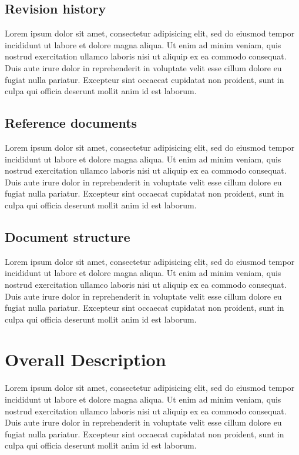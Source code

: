 \documentclass[10pt,a4paper]{report}
\begin{document}
	\section{Revision history}
	Lorem ipsum dolor sit amet, consectetur adipisicing elit, sed do eiusmod
	tempor incididunt ut labore et dolore magna aliqua. Ut enim ad minim veniam,
	quis nostrud exercitation ullamco laboris nisi ut aliquip ex ea commodo
	consequat. Duis aute irure dolor in reprehenderit in voluptate velit esse
	cillum dolore eu fugiat nulla pariatur. Excepteur sint occaecat cupidatat non
	proident, sunt in culpa qui officia deserunt mollit anim id est laborum.
	
	\section{Reference documents}
	Lorem ipsum dolor sit amet, consectetur adipisicing elit, sed do eiusmod
	tempor incididunt ut labore et dolore magna aliqua. Ut enim ad minim veniam,
	quis nostrud exercitation ullamco laboris nisi ut aliquip ex ea commodo
	consequat. Duis aute irure dolor in reprehenderit in voluptate velit esse
	cillum dolore eu fugiat nulla pariatur. Excepteur sint occaecat cupidatat non
	proident, sunt in culpa qui officia deserunt mollit anim id est laborum.
	
	\section{Document structure}
	Lorem ipsum dolor sit amet, consectetur adipisicing elit, sed do eiusmod
	tempor incididunt ut labore et dolore magna aliqua. Ut enim ad minim veniam,
	quis nostrud exercitation ullamco laboris nisi ut aliquip ex ea commodo
	consequat. Duis aute irure dolor in reprehenderit in voluptate velit esse
	cillum dolore eu fugiat nulla pariatur. Excepteur sint occaecat cupidatat non
	proident, sunt in culpa qui officia deserunt mollit anim id est laborum.
	
	\chapter{Overall Description}
	Lorem ipsum dolor sit amet, consectetur adipisicing elit, sed do eiusmod
	tempor incididunt ut labore et dolore magna aliqua. Ut enim ad minim veniam,
	quis nostrud exercitation ullamco laboris nisi ut aliquip ex ea commodo
	consequat. Duis aute irure dolor in reprehenderit in voluptate velit esse
	cillum dolore eu fugiat nulla pariatur. Excepteur sint occaecat cupidatat non
	proident, sunt in culpa qui officia deserunt mollit anim id est laborum.
	
\end{document}
